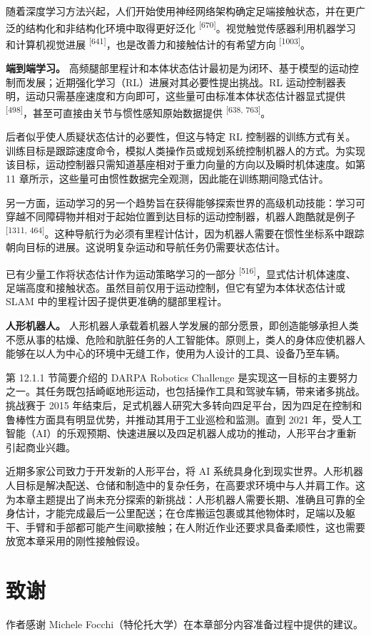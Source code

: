 随着深度学习方法兴起，人们开始使用神经网络架构确定足端接触状态，并在更广泛的结构化和非结构化环境中取得更好泛化 \textsuperscript{[670]}。视觉触觉传感器利用机器学习和计算机视觉进展 \textsuperscript{[641]}，也是改善力和接触估计的有希望方向 \textsuperscript{[1003]}。

\textbf{端到端学习。} 高频腿部里程计和本体状态估计最初是为闭环、基于模型的运动控制而发展；近期强化学习（RL）进展对其必要性提出挑战。RL 运动控制器表明，运动只需基座速度和方向即可，这些量可由标准本体状态估计器显式提供 \textsuperscript{[498]}，甚至可直接由关节与惯性感知原始数据提供 \textsuperscript{[638, 763]}。

后者似乎使人质疑状态估计的必要性，但这与特定 RL 控制器的训练方式有关。训练目标是跟踪速度命令，模拟人类操作员或规划系统控制机器人的方式。为实现该目标，运动控制器只需知道基座相对于重力向量的方向以及瞬时机体速度。如第 11 章所示，这些量可由惯性数据完全观测，因此能在训练期间隐式估计。

另一方面，运动学习的另一个趋势旨在获得能够探索世界的高级机动技能：学习可穿越不同障碍物并相对于起始位置到达目标的运动控制器，机器人跑酷就是例子 \textsuperscript{[1311, 464]}。这种导航行为必须有里程计估计，因为机器人需要在惯性坐标系中跟踪朝向目标的进展。这说明复杂运动和导航任务仍需要状态估计。

已有少量工作将状态估计作为运动策略学习的一部分 \textsuperscript{[516]}，显式估计机体速度、足端高度和接触状态。虽然目前仅用于运动控制，但它有望为本体状态估计或 SLAM 中的里程计因子提供更准确的腿部里程计。

\textbf{人形机器人。} 人形机器人承载着机器人学发展的部分愿景，即创造能够承担人类不愿从事的枯燥、危险和肮脏任务的人工智能体。原则上，类人的身体应使机器人能够在以人为中心的环境中无缝工作，使用为人设计的工具、设备乃至车辆。

第 12.1.1 节简要介绍的 DARPA Robotics Challenge 是实现这一目标的主要努力之一。其任务既包括崎岖地形运动，也包括操作工具和驾驶车辆，带来诸多挑战。挑战赛于 2015 年结束后，足式机器人研究大多转向四足平台，因为四足在控制和鲁棒性方面具有明显优势，并推动其用于工业巡检和监测。直到 2021 年，受人工智能（AI）的乐观预期、快速进展以及四足机器人成功的推动，人形平台才重新引起商业兴趣。

近期多家公司致力于开发新的人形平台，将 AI 系统具身化到现实世界。人形机器人目标是解决配送、仓储和制造中的复杂任务，在高要求环境中与人并肩工作。这为本章主题提出了尚未充分探索的新挑战：人形机器人需要长期、准确且可靠的全身估计，才能完成最后一公里配送；在仓库搬运包裹或其他物体时，足端以及躯干、手臂和手部都可能产生间歇接触；在人附近作业还要求具备柔顺性，这也需要放宽本章采用的刚性接触假设。

\section{致谢}

作者感谢 Michele Focchi（特伦托大学）在本章部分内容准备过程中提供的建议。
